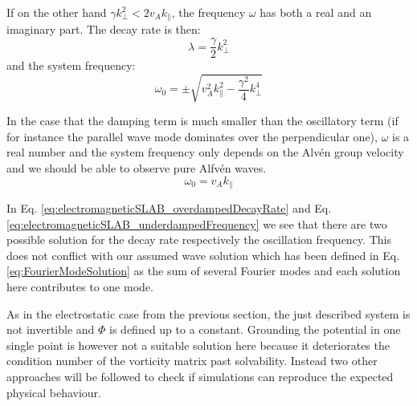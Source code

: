 If on the other hand $\gamma k_\perp^2 < 2v_Ak_\parallel$, the frequency $\omega$ has both a real and an imaginary part. The decay rate is then:
\begin{equation} 
	\lambda = \frac{\gamma}{2}k_\perp^2 \label{eq:electromagneticSLAB_underdampedDecayRate}
\end{equation}
and the system frequency: 
\begin{equation} 
	\omega_0 = \pm\sqrt{v_A^2k_\parallel^2 - \frac{\gamma^2}{4}k_\perp^4} \label{eq:electromagneticSLAB_underdampedFrequency}
\end{equation}

In the case that the damping term is much smaller than the oscillatory term (if for instance the parallel wave mode dominates over the perpendicular one), $\omega$ is a real number and the system frequency only depends on the Alvén group velocity and we should be able to observe pure Alfvén waves.
$$ \omega_0 = v_A k_\parallel$$

In Eq. \ref{eq:electromagneticSLAB_overdampedDecayRate} and Eq. \ref{eq:electromagneticSLAB_underdampedFrequency} we see that there are two possible solution for the decay rate respectively the oscillation frequency. This does not conflict with our assumed wave solution which has been defined in Eq. \ref{eq:FourierModeSolution} as the sum of several Fourier modes and each solution here contributes to one mode. 
 
As in the electrostatic case from the previous section, the just described system is not invertible and $\Phi$ is defined up to a constant. Grounding the potential in one single point is however not a suitable solution here because it deteriorates the condition number of the vorticity matrix past solvability. Instead two other approaches will be followed to check if simulations can reproduce the expected physical behaviour. 


